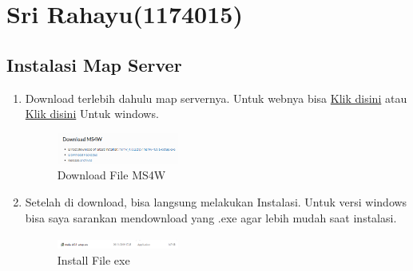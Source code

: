 \section{Sri Rahayu(1174015)}
\subsection{Instalasi Map Server}
\begin{enumerate}
    \item Download terlebih dahulu map servernya. Untuk webnya bisa \href{https://mapserver.org/}{Klik disini} atau \href{https://ms4w.com/}{Klik disini} Untuk windows.
    \hfill\break
    \begin{figure}[H]
		\includegraphics[width=4cm]{figures/1174015/4/No1.png}
		\centering
		\caption{Download File MS4W}
    \end{figure}
    \hfill\break

    \item Setelah di download, bisa langsung melakukan Instalasi. Untuk versi windows bisa saya sarankan mendownload yang .exe agar lebih mudah saat instalasi.
    \hfill\break
    \begin{figure}[H]
		\includegraphics[width=4cm]{figures/1174015/4/No2.png}
		\centering
		\caption{Install File exe}
    \end{figure}
    \hfill\break

\end{enumerate}


